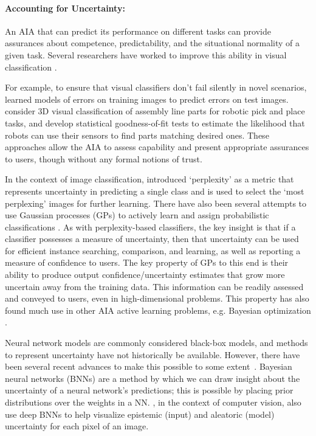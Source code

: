 \paragraph{Accounting for Uncertainty:} \label{sec:acct_uncertainty}
An AIA that can predict its performance on different tasks can provide assurances about competence, predictability, and the situational normality of a given task. Several researchers have worked to improve this ability in visual classification \cite{Zhang2014-he,Gurau2016-hs,Churchill2015-ei,Kaipa2015-hy}. 

For example, to ensure that visual classifiers don't fail silently in novel scenarios, \citet{Zhang2014-he} learned models of errors on training images to predict errors on test images. \citet{Kaipa2015-hy} consider 3D visual classification of assembly line parts for robotic pick and place tasks, and develop statistical goodness-of-fit tests to estimate the likelihood that robots can use their sensors to find parts matching desired ones. These approaches allow the AIA to assess capability and present appropriate assurances to users, though without any formal notions of trust. 

In the context of image classification, \citet{Paul2011-vr} introduced `perplexity' as a metric that represents uncertainty in predicting a single class and is used to select the `most perplexing' images for further learning. There have also been several attempts to use Gaussian processes (GPs) to actively learn and assign probabilistic classifications \cite{MacKay1992-sp,Triebel2016-kj,Triebel2013-ow,Triebel2013-ku,Grimmett2013-gj,Grimmett2016-yc,Berczi2015-rd,Dequaire2016-kh}. As with perplexity-based classifiers, the key insight is that if a classifier possesses a measure of uncertainty, then that uncertainty can be used for efficient instance searching, comparison, and learning, as well as reporting a measure of confidence to users. The key property of GPs to this end is their ability to produce output confidence/uncertainty estimates that grow more uncertain away from the training data. This information can be readily assessed and conveyed to users, even in high-dimensional problems. This property has also found much use in other AIA active learning problems, e.g. Bayesian optimization \cite{Snoek2012-tt, Brochu2010-tj,Israelsen2017-zb}.

Neural network models are commonly considered black-box models, and methods to represent uncertainty have not historically be available. However, there have been several recent advances to make this possible to some extent~\cite{Gal2016-om,Gal2016-eq}. Bayesian neural networks (BNNs) are a method by which we can draw insight about the uncertainty of a neural network's predictions; this is possible by placing prior distributions over the weights in a NN. \citet{Kendall2017-ry}, in the context of computer vision, also use deep BNNs to help visualize epistemic (input) and aleatoric (model) uncertainty for each pixel of an image.

